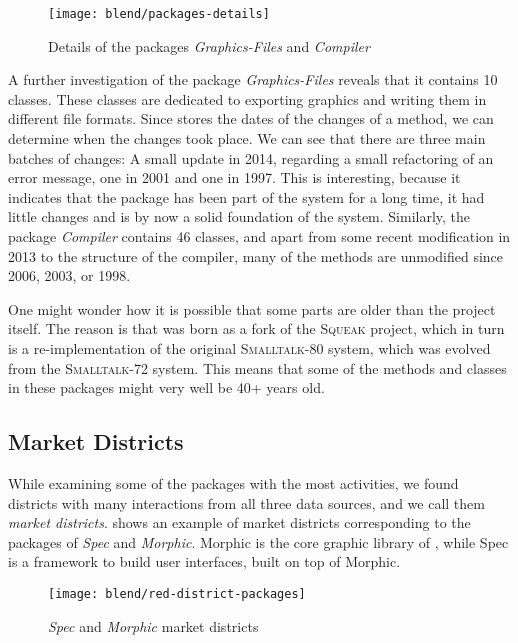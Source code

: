 \begin{figure}[ht]
\centering
\texttt{[image: blend/packages-details]}
\caption{Details of the packages \textit{Graphics-Files} and \textit{Compiler}}
\label{fig:packages-details}
\end{figure}

A further investigation of the package \textit{Graphics-Files} reveals that it contains 10 classes.
These classes are dedicated to exporting graphics and writing them in different file formats.
Since \pha stores the dates of the changes of a method, we can determine when the changes took place.
We can see that there are three main batches of changes: A small update in 2014, regarding a small refactoring of an error message, one in 2001 and one in 1997.
This is interesting, because it indicates that the package has been part of the system for a long time, it had little changes and is by now a solid foundation of the system.
Similarly, the package \textit{Compiler} contains 46 classes, and apart from some recent modification in 2013 to the structure of the compiler, many of the methods are unmodified since 2006, 2003, or 1998.

One might wonder how it is possible that some parts are older than the \pha project itself.
The reason is that \pha was born as a fork of the \textsc{Squeak} project, which in turn is a re-implementation of the original \textsc{Smalltalk-80} system, which was evolved from the \textsc{Smalltalk-72} system.
This means that some of the methods and classes in these packages might very well be 40+ years old.

\subsection{Market Districts}

While examining some of the packages with the most activities, we found districts with many interactions from all three data sources, and we call them \emph{market districts}.
 shows an example of market districts corresponding to the packages of \textit{Spec} and \textit{Morphic}.
Morphic is the core graphic library of \pha, while Spec is a framework to build user interfaces, built on top of Morphic.

\begin{figure}[ht]
\centering
\texttt{[image: blend/red-district-packages]}
\caption{\textit{Spec} and \textit{Morphic} market districts}
\label{fig:market-districts}
\end{figure}

